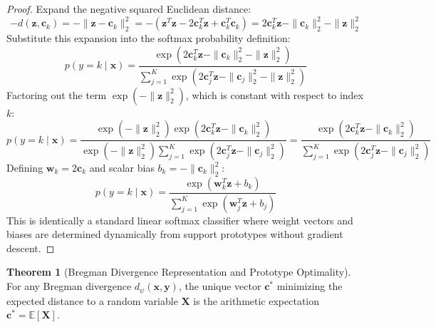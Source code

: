 \documentclass[11pt,a4paper]{article}
\theoremstyle{definition}
\newtheorem{theorem}{\textbf{Theorem}}[section]
\begin{document}
\begin{proof}
Expand the negative squared Euclidean distance:
{\boldmath
\begin{equation}
-d(\mathbf{z}, \mathbf{c}_k) = -\|\mathbf{z} - \mathbf{c}_k\|_2^2 = -(\mathbf{z}^T \mathbf{z} - 2 \mathbf{c}_k^T \mathbf{z} + \mathbf{c}_k^T \mathbf{c}_k) = 2 \mathbf{c}_k^T \mathbf{z} - \|\mathbf{c}_k\|_2^2 - \|\mathbf{z}\|_2^2
\end{equation}
}
Substitute this expansion into the softmax probability definition:
{\boldmath
\begin{equation}
p(y = k \mid \mathbf{x}) = \frac{\exp\left( 2 \mathbf{c}_k^T \mathbf{z} - \|\mathbf{c}_k\|_2^2 - \|\mathbf{z}\|_2^2 \right)}{\sum_{j=1}^K \exp\left( 2 \mathbf{c}_j^T \mathbf{z} - \|\mathbf{c}_j\|_2^2 - \|\mathbf{z}\|_2^2 \right)}
\end{equation}
}
Factoring out the term $\exp(-\|\mathbf{z}\|_2^2)$, which is constant with respect to index $k$:
{\boldmath
\begin{equation}
p(y = k \mid \mathbf{x}) = \frac{\exp(-\|\mathbf{z}\|_2^2) \exp\left( 2 \mathbf{c}_k^T \mathbf{z} - \|\mathbf{c}_k\|_2^2 \right)}{\exp(-\|\mathbf{z}\|_2^2) \sum_{j=1}^K \exp\left( 2 \mathbf{c}_j^T \mathbf{z} - \|\mathbf{c}_j\|_2^2 \right)} = \frac{\exp\left( 2 \mathbf{c}_k^T \mathbf{z} - \|\mathbf{c}_k\|_2^2 \right)}{\sum_{j=1}^K \exp\left( 2 \mathbf{c}_j^T \mathbf{z} - \|\mathbf{c}_j\|_2^2 \right)}
\end{equation}
}
Defining $\mathbf{w}_k = 2\mathbf{c}_k$ and scalar bias $b_k = -\|\mathbf{c}_k\|_2^2$:
{\boldmath
\begin{equation}
p(y = k \mid \mathbf{x}) = \frac{\exp(\mathbf{w}_k^T \mathbf{z} + b_k)}{\sum_{j=1}^K \exp(\mathbf{w}_j^T \mathbf{z} + b_j)}
\end{equation}
}
This is identically a standard linear softmax classifier where weight vectors and biases are determined dynamically from support prototypes without gradient descent.
\end{proof}

\begin{theorem}[Bregman Divergence Representation and Prototype Optimality]
For any Bregman divergence $d_\psi(\mathbf{x}, \mathbf{y})$, the unique vector $\mathbf{c}^*$ minimizing the expected distance to a random variable $\mathbf{X}$ is the arithmetic expectation $\mathbf{c}^* = \mathbb{E}[\mathbf{X}]$.
\end{theorem}
\end{document}
